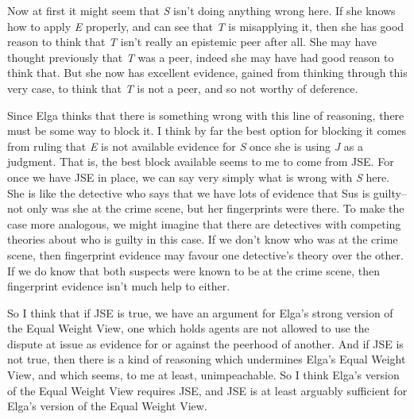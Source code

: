 \documentclass[
  10pt,
  letterpaper,
  DIV=11,
  numbers=noendperiod,
  twoside]{scrartcl}
\begin{document}
Now at first it might seem that \emph{S} isn't doing anything wrong
here. If she knows how to apply \emph{E} properly, and can see that
\emph{T} is misapplying it, then she has good reason to think that
\emph{T} isn't really an epistemic peer after all. She may have thought
previously that \emph{T} was a peer, indeed she may have had good reason
to think that. But she now has excellent evidence, gained from thinking
through this very case, to think that \emph{T} is not a peer, and so not
worthy of deference.

Since Elga thinks that there is something wrong with this line of
reasoning, there must be some way to block it. I think by far the best
option for blocking it comes from ruling that \emph{E} is not available
evidence for \emph{S} once she is using \emph{J} as a judgment. That is,
the best block available seems to me to come from JSE. For once we have
JSE in place, we can say very simply what is wrong with \emph{S} here.
She is like the detective who says that we have lots of evidence that
Sus is guilty--not only was she at the crime scene, but her fingerprints
were there. To make the case more analogous, we might imagine that there
are detectives with competing theories about who is guilty in this case.
If we don't know who was at the crime scene, then fingerprint evidence
may favour one detective's theory over the other. If we do know that
both suspects were known to be at the crime scene, then fingerprint
evidence isn't much help to either.

So I think that if JSE is true, we have an argument for Elga's strong
version of the Equal Weight View, one which holds agents are not allowed
to use the dispute at issue as evidence for or against the peerhood of
another. And if JSE is not true, then there is a kind of reasoning which
undermines Elga's Equal Weight View, and which seems, to me at least,
unimpeachable. So I think Elga's version of the Equal Weight View
requires JSE, and JSE is at least arguably sufficient for Elga's version
of the Equal Weight View.
\end{document}
